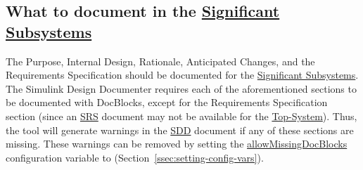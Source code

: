 \documentclass{mcscert}
\newcommand{\sddtool}{Simulink Design Documenter}
\newcommand{\topsystemnolink}{Top-System} %
\newcommand{\topsystem}{\hyperref[def:topsystem]{\topsystemnolink{}}}
\newcommand{\sigsubsnolink}{Significant Subsystems} %
\newcommand{\sigsubs}{\hyperref[def:sigsubs]{\sigsubsnolink{}}}
\begin{document}
	\subsection{What to document in the \sigsubs{}} 
	\label{ssec:what-to-doc-sigsub}
	The Purpose, Internal Design, Rationale, Anticipated Changes, and the	Requirements Specification should be documented for the \sigsubs{}. 
	The \sddtool{} requires each of the aforementioned sections to be documented with \textsf{DocBlocks}, except for the Requirements Specification section (since an \hyperref[acr:srs]{SRS} document may not be available for the \topsystem{}). 
	Thus, the tool will generate warnings in the \hyperref[acr:sdd]{SDD} document if any of these sections are missing. 
	These warnings can be removed by setting the \hyperref[itm:allowMissingDocBlocks]{allowMissingDocBlocks} configuration variable to  (Section~\ref{ssec:setting-config-vars}).
\end{document}
